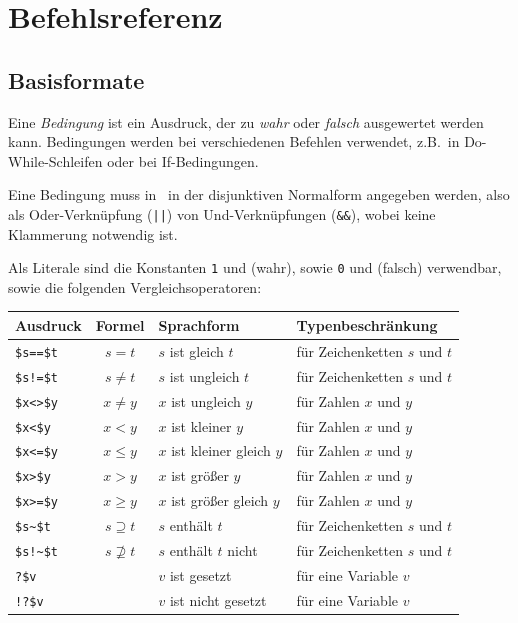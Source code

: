 \chapter{Befehlsreferenz}\label{Befehlsreferenz}

\section{Basisformate}
\begin{basisformat}\label{defBedingungen}
Eine \emph{Bedingung} ist ein Ausdruck, der zu \emph{wahr} oder \emph{falsch} ausgewertet werden kann. Bedingungen werden bei verschiedenen Befehlen verwendet, z.B.\ in Do-While-Schleifen oder  bei If-Bedingungen.\par
Eine Bedingung muss in \FPZ\ in der disjunktiven Normalform angegeben werden, also als Oder-Verknüpfung (\verb=||=) von Und-Verknüpfungen (\verb|&&|), wobei keine Klammerung notwendig ist.

Als Literale sind die Konstanten \verb|1| und  (wahr), sowie \verb|0| und  (falsch) verwendbar, sowie die folgenden Vergleichsoperatoren:
\begin{center}
\begin{tabular}{|l|c|l|l|}\hline
Ausdruck& Formel & Sprachform & Typenbeschränkung\\\hline\hline
\verb|$s==$t| & $s=t$ & $s$ ist gleich $t$ & für Zeichenketten $s$ und $t$\\
\verb|$s!=$t|  & $s\neq t$ & $s$ ist ungleich $t$ & für Zeichenketten $s$ und $t$\\
\verb|$x<>$y| & $x\neq y$ & $x$ ist ungleich $y$ & für Zahlen $x$ und $y$\\
\verb|$x<$y| & $x<y$ & $x$ ist kleiner $y$ & für Zahlen $x$ und $y$\\
\verb|$x<=$y| & $x\le y$ & $x$ ist kleiner gleich $y$ & für Zahlen $x$ und $y$\\
\verb|$x>$y| & $x>y$ & $x$ ist größer $y$ & für Zahlen $x$ und $y$\\
\verb|$x>=$y| & $x\ge y$ & $x$ ist größer gleich $y$ & für Zahlen $x$ und $y$\\
\verb|$s~$t| & $s\supseteq t$ & $s$ enthält $t$ & für Zeichenketten $s$ und $t$\\
\verb|$s!~$t| & $s\nsupseteq t$ & $s$ enthält $t$ nicht & für Zeichenketten $s$ und $t$\\
\verb|?$v| && $v$ ist gesetzt & für eine Variable $v$\\
\verb|!?$v| && $v$ ist nicht gesetzt & für eine Variable $v$\\\hline
\end{tabular}
\end{center}
\end{basisformat}

